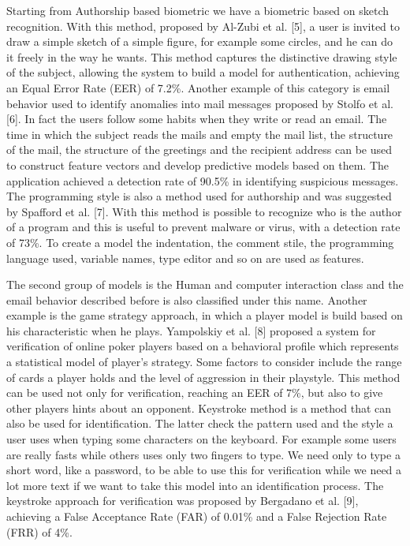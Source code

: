 \documentclass{article}
\begin{document}
Starting from Authorship based biometric we have a biometric based on sketch recognition. 
With this method, proposed by Al-Zubi et al. [5], a user is invited to draw a simple sketch of a simple figure, for example some circles, and he can do it freely in the way he wants.
This method captures the distinctive drawing style of the subject, allowing the system to build a model for authentication, achieving an Equal Error Rate (EER) of 7.2\%.
Another example of this category is email behavior used to identify anomalies into mail messages proposed by Stolfo et al. [6].
In fact the users follow some habits when they write or read an email.
The time in which the subject reads the mails and empty the mail list, the structure of the mail, the structure of the greetings and the recipient address can be used to construct feature vectors and develop predictive models based on them.
The application achieved a detection rate of 90.5\% in identifying suspicious messages.
The programming style is also a method used for authorship and was suggested by Spafford et al. [7]. 
With this method is possible to recognize who is the author of a program and this is useful to prevent malware or virus, with a detection rate of 73\%.
To create a model the indentation, the comment stile, the programming language used, variable names, type editor and so on are used as features.

The second group of models is the Human and computer interaction class and the email behavior described before is also classified under this name.
Another example is the game strategy approach, in which a player model is build based on his characteristic when he plays.
Yampolskiy et al. [8] proposed a system for verification of online poker players based on a behavioral profile which represents a statistical model of player's strategy.
Some factors to consider include the range of cards a player holds and the level of aggression in their playstyle. 
This method can be used not only for verification, reaching an EER of 7\%, but also to give other players hints about an opponent.
Keystroke method is a method that can also be used for identification. 
The latter check the pattern used and the style a user uses when typing some characters on the keyboard. 
For example some users are really fasts while others uses only two fingers to type.
We need only to type a short word, like a password, to be able to use this for verification while we need a lot more text if we want to take this model into an identification process.
The keystroke approach for verification was proposed by Bergadano et al. [9], achieving a False Acceptance Rate (FAR) of 0.01\% and a False Rejection Rate (FRR) of 4\%.
\end{document}
